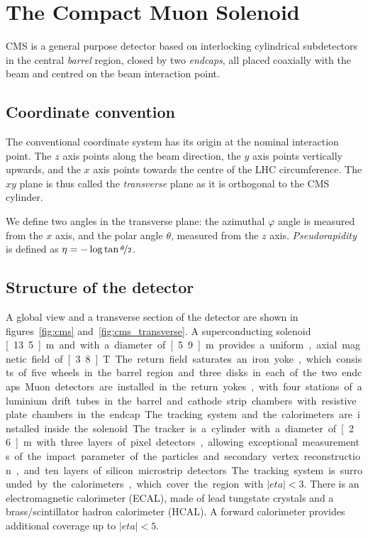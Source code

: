 \section{The Compact Muon Solenoid}
CMS is a general purpose detector based on interlocking cylindrical
subdetectors in the central \emph{barrel} region, closed by two
\emph{endcaps}, all placed coaxially with the beam and centred on the beam interaction point.
\subsection{Coordinate convention}
The conventional coordinate system has its origin at the nominal interaction
point. The $z$ axis points along the beam direction, the $y$ axis points
vertically upwards, and the $x$ axis points towards the centre of the LHC
circumference. The $xy$ plane is thus called the \emph{transverse} plane as
it is orthogonal to the CMS cylinder.

We define two angles in the transverse plane: the azimuthal $\varphi$ angle
is measured from the $x$ axis, and the polar angle $\theta$, measured from
the $z$ axis.
\emph{Pseudorapidity} is defined as $\eta = -\log \tan
\nicefrac{\theta}{2}$.

\subsection{Structure of the detector}
A global view and a transverse section of the detector are shown in
figures~\ref{fig:cms} and~\ref{fig:cms_transverse}.
A superconducting solenoid \unit[13.5]{m} and with a diameter of
\unit[5.9]{m} provides a uniform, axial magnetic field of \unit[3.8]{T}.
The return field saturates an iron yoke, which consists of five wheels in
the barrel region and three disks in each of the two endcaps.
Muon detectors are installed in the return yokes, with four stations of
aluminium drift tubes in the barrel and cathode strip chambers with
resistive plate chambers in the endcap.

The tracking system and the calorimeters are installed inside the solenoid.
The tracker is a cylinder with a diameter of \unit[2.6]{m} with three layers
of pixel detectors, allowing exceptional measurements of the impact parameter
of the particles and secondary vertex reconstruction, and ten layers of
silicon microstrip detectors.
The tracking system is surrounded by the calorimeters, which cover the
region with $|eta| < 3$. There is an electromagnetic calorimeter (ECAL),
made of lead tungstate crystals and a brass/scintillator hadron calorimeter
(HCAL). A forward calorimeter provides additional coverage up to $|eta| <
5$.

